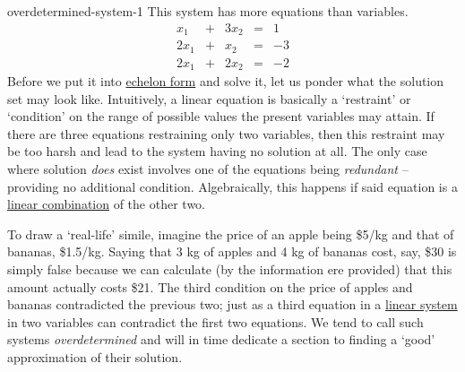 \begin{example}{}{overdetermined-system-1}
 This system has more equations than variables.
 \begin{equation}
  \label{eq:overdetermined-system}
  \begin{array}{rcrcr}
    x_1 & + & 3x_2 & = & 1\\
    2x_1 & + & x_2 & = & -3\\
    2x_1 & + & 2x_2 & = & -2
  \end{array}
 \end{equation}
 Before we put it into \hyperref[def:echelon-form]{echelon form} and solve it,
 let us ponder what the solution set may look like. Intuitively, a linear
 equation is basically a `restraint' or `condition' on the range of possible
 values the present variables may attain. If there are three equations
 restraining only two variables, then this restraint may be too harsh and lead
 to the system having no solution at all. The only case where solution
 \emph{does} exist involves one of the equations being \emph{redundant} --
 providing no additional condition. Algebraically, this happens if said equation
 is a \hyperref[def:linear-combination]{linear combination} of the other two.

 To draw a `real-life' simile, imagine the price of an apple being \$5/kg and
 that of bananas, \$1.5/kg. Saying that 3 kg of apples and 4 kg of bananas cost,
 say, \$30 is simply false because we can calculate (by the information ere
 provided) that this amount actually costs \$21. The third condition on the
 price of apples and bananas contradicted the previous two; just as a third
 equation in a \hyperref[def:linear-system]{linear system} in two variables can
 contradict the first two equations. We tend to call such systems
 \emph{overdetermined} and will in time dedicate a section to finding a `good'
 approximation of their solution.


\end{example}

